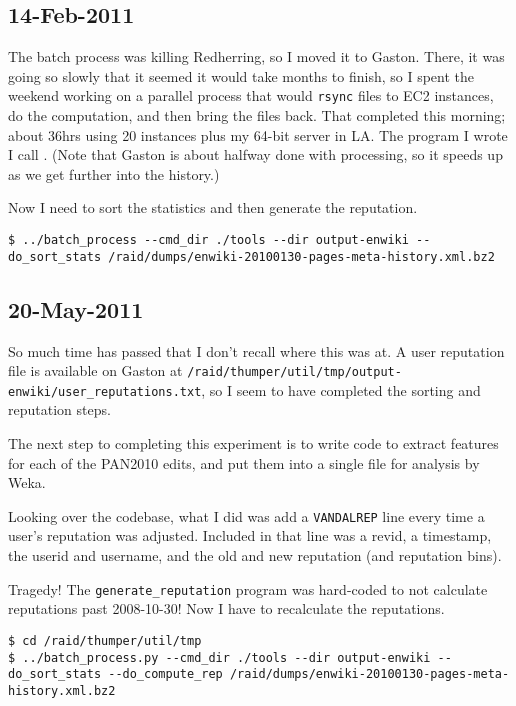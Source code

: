 \subsection{14-Feb-2011}

The batch process was killing Redherring, so I moved it to Gaston.
There, it was going so slowly that it seemed it would take months
to finish, so I spent the weekend working on a parallel process that
would \texttt{rsync} files to EC2 instances, do the computation,
and then bring the files back.
That completed this morning; about 36hrs using 20 instances plus
my 64-bit server in LA.
The program I wrote I call .
(Note that Gaston is about halfway done with processing, so
it speeds up as we get further into the history.)

Now I need to sort the statistics and then generate the reputation.
\begin{verbatim}
$ ../batch_process --cmd_dir ./tools --dir output-enwiki --do_sort_stats /raid/dumps/enwiki-20100130-pages-meta-history.xml.bz2
\end{verbatim}

\subsection{20-May-2011}

So much time has passed that I don't recall where this was at.
A user reputation file is available on Gaston at
\texttt{/raid/thumper/util/tmp/output-enwiki/user\_reputations.txt},
so I seem to have completed the sorting and reputation steps.

The next step to completing this experiment is to write code to
extract features for each of the PAN2010 edits, and put them into
a single file for analysis by Weka.

Looking over the codebase, what I did was add a \texttt{VANDALREP}
line every time a user's reputation was adjusted.
Included in that line was a revid, a timestamp, the userid and username,
and the old and new reputation (and reputation bins).

Tragedy!  The \texttt{generate\_reputation} program was hard-coded
to not calculate reputations past 2008-10-30!
Now I have to recalculate the reputations.

\begin{verbatim}
$ cd /raid/thumper/util/tmp
$ ../batch_process.py --cmd_dir ./tools --dir output-enwiki --do_sort_stats --do_compute_rep /raid/dumps/enwiki-20100130-pages-meta-history.xml.bz2
\end{verbatim}

